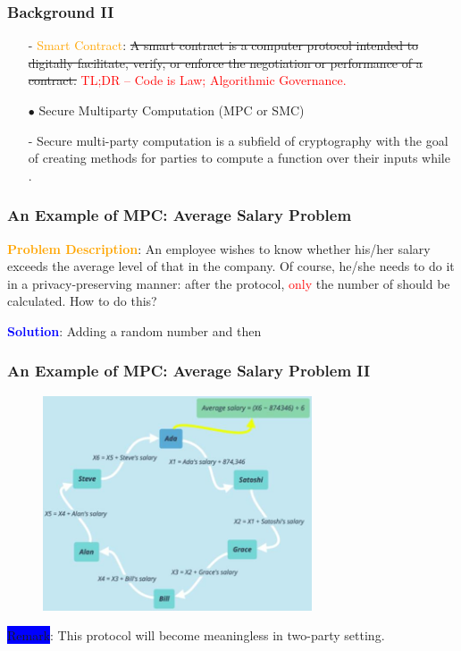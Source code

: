\documentclass{beamer}
\begin{document}
\begin{frame}\frametitle{Background II} 
\begin{enumerate}
	\item[] - \textcolor{orange}{Smart Contract}: \sout{A smart contract is a computer protocol intended to digitally facilitate, verify, or enforce the negotiation or performance of a contract.} \textcolor{red}{TL;DR -- Code is Law; Algorithmic Governance.}
	\item[$\bullet$] Secure Multiparty Computation (MPC or SMC)
	\item[] - Secure multi-party computation is a subfield of cryptography with the goal of creating methods for parties to \uwave{\textcolor{orange}{jointly}} compute a function over their inputs while . 
\end{enumerate}
\end{frame}


\begin{frame}\frametitle{An Example of MPC: Average Salary Problem} 
\textcolor{orange}{\textbf{Problem Description}}: An employee wishes to know whether his/her salary exceeds the average level of that in the company. Of course, he/she needs to do it in a privacy-preserving manner: after the protocol, \textcolor{red}{only} the number of  should be calculated. How to do this?

\vspace{0.5cm}

\textcolor{blue}{\textbf{Solution}}: Adding a random number and then 
\end{frame}

\begin{frame}\frametitle{An Example of MPC: Average Salary Problem II}
\begin{figure}
	\includegraphics[width=3.2 in, height=2.5in]{myfigs/averagesalary.jpg}
\end{figure}
\colorbox{blue}{Remark}: This protocol will become meaningless in two-party setting. 
\end{frame}
\end{document}
